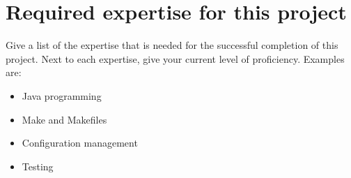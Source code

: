 
\section{Required expertise for this project}
Give a list of the expertise that is needed for the successful completion of this project. Next to each expertise, give your current level of proficiency. Examples are:
\begin{itemize}
    \item Java programming
	\item	  Make and Makefiles
	\item	  Configuration management
	\item	  Testing
\end{itemize}
